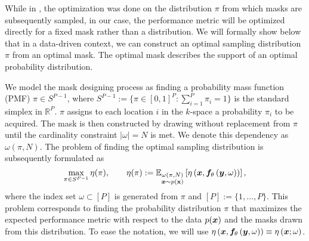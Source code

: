 
While in \citet{chauffert2013variable}, the optimization was done on the distribution $\pi$ from which masks are subsequently sampled, in our case, the performance metric will be optimized directly for a fixed mask rather than a distribution. We will formally show below that in a data-driven context, we can construct an optimal sampling distribution $\pi$ from an optimal mask. The optimal mask describes the support of an optimal probability distribution. 

We model the mask designing process as finding a probability mass function (PMF) $\pi \in S^{P-1}$, where $S^{P-1} := \{\pi \in [0,1]^P : \sum_{i=1}^P \pi_i =1\}$ is the standard simplex in $\mathbb{R}^P$. $\pi$ assigns to each location $i$ in the $k$-space a probability $\pi_i$ to be acquired. The mask is then constructed by drawing without replacement from $\pi$ until the cardinality constraint $|\omega|=N$ is met. We denote this dependency as $\omega(\pi,N)$. The problem of finding the optimal sampling distribution is subsequently formulated as \useshortskip
\begin{equation}
\max_{\pi\in S^{P-1}} \eta(\pi), 
\qquad \eta(\pi) :=  \mathbb{E}_{\substack{\omega(\pi,N)\\ {\bm{x}} \sim p({\mathbf{x}})}}\left[\eta\left({\bm{x}}, {\bm{f}}_\theta\left({\bm{y}},\omega\right)\right)\right],
\label{eq:main}
\end{equation}
where the index set $\omega\subset [P] $ is generated from $\pi$ and $[P] := \{1,\ldots,P\}$. This problem corresponds to finding the probability distribution $\pi$ that maximizes the expected performance metric with respect to the data $p({\bm{x}})$ and the masks drawn from this distribution. To ease the notation, we will use $\eta\left({\bm{x}}, {\bm{f}}_\theta\left({\bm{y}},\omega\right)\right) \equiv \eta\left({\bm{x}}; \omega\right)$.

